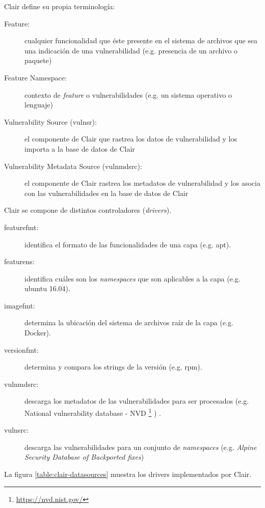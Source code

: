 Clair define su propia terminología:

\begin{description}
	\item [Feature:] cualquier funcionalidad que éste presente en el sistema de archivos que sea una indicación de una vulnerabilidad (e.g. presencia de un archivo o paquete)
	\item [Feature Namespace:] contexto de \emph{feature} o vulnerabilidades (e.g. un sistema operativo o lenguaje)
	\item [Vulnerability Source (vulnsr):] el componente de Clair que rastrea los datos de vulnerabilidad y los importa a la base de datos de Clair
	\item [Vulnerability Metadata Source (vulnmdsrc):] el componente de Clair rastrea los metadatos de vulnerabilidad y los asocia con las vulnerabilidades en la base de datos de Clair
\end{description}

Clair se compone de distintos controladores (\emph{drivers}).

\begin{description}
	\item [featurefmt:] identifica el formato de las funcionalidades de una capa (e.g. apt).
	\item [featurens:] identifica cuáles son los \emph{namespaces} que son aplicables a la capa (e.g. ubuntu 16.04).
	\item [imagefmt:] determina la ubicación del sistema de archivos raíz de la capa (e.g. Docker).
	\item [versionfmt:] determina y compara los strings de la versión (e.g. rpm).
	\item [vulnmdsrc:] descarga los metadatos de las vulnerabilidades para ser procesados (e.g. National vulnerability database - NVD \footnote{\url{https://nvd.nist.gov/}} ) .
	\item [vulnsrc:] descarga las vulnerabilidades para un conjunto de \emph{namespaces} (e.g. \emph{Alpine Security Database of Backported fixes})
\end{description}

La figura \ref{table:clair-datasources} muestra los drivers implementados por Clair.

